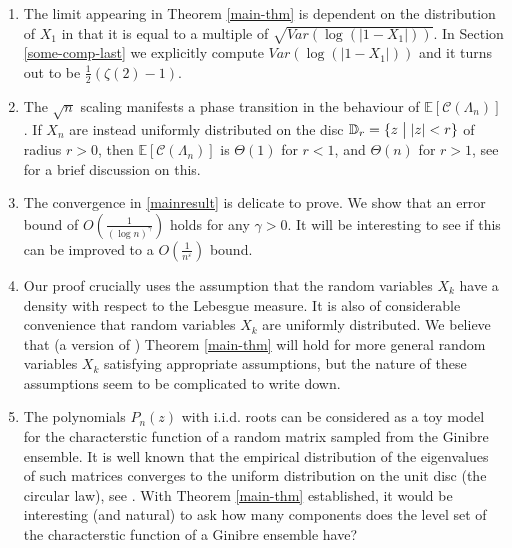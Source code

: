 \documentclass[9pt,a4paper,reqno]{amsart}
\theoremstyle{mine}
\theoremstyle{definition}
\theoremstyle{remark}
\renewcommand\epsilon{\varepsilon}
\newcommand{\mb}{\mathbb}
\begin{document}
\begin{enumerate}


    \item The limit appearing in Theorem \ref{main-thm} is dependent on the distribution of $X_1$ in that it is equal to a multiple of $\sqrt{Var(\log(|1-X_1|))}$. In Section \ref{some-comp-last} we explicitly compute $Var(\log(|1-X_1|))$ and it turns out to be $\frac{1}{2} \left(\zeta(2) - 1 \right)$.
 
    \item The $\sqrt{n}$ scaling manifests a phase transition in the behaviour of $\mb{E}[\mathscr{C}(\Lambda_n)]$. If $X_n$ are instead uniformly distributed on the disc $\mathbb{D}_r = \{z \hspace{1mm} \bigl| \hspace{1mm} |z| <r\}$ of radius $r>0$, then $\mb{E}[\mathscr{C}(\Lambda_n)]$ is $\Theta(1)$ for $r<1$, and $\Theta(n)$ for $r>1$, see \cite[Remark~$1.3$]{Ghosh-numberofcomponents} for a brief discussion on this.
    
    \item The convergence in \eqref{mainresult} is delicate to prove. We show that an error bound of $O(\frac{1}{(\log n)^\gamma})$ holds for any $\gamma>0$. It will be interesting to see if this can be improved to a $O(\frac{1}{n^\epsilon})$ bound. 

    \item Our proof crucially uses the assumption that the random variables $X_k$ have a density with respect to the Lebesgue measure. It is also 
    of considerable convenience that random variables $X_k$ are uniformly distributed. We believe that (a version of ) Theorem \ref{main-thm} will hold for more general random variables $X_k$ satisfying appropriate assumptions, but the nature of these assumptions seem to be complicated to write down.

    \item The polynomials $P_n(z)$ with i.i.d. roots can be considered as a toy model for the characterstic function of a random matrix sampled from the Ginibre ensemble. It is well known that the empirical distribution of the eigenvalues of such matrices converges to the uniform distribution on the unit disc (the circular law), see \cite{Tao-Vu-Randommatrices-universality-circularlaw}. With Theorem \ref{main-thm} established, it would be interesting (and natural) to ask how many components does the level set of the characterstic function of a Ginibre ensemble have? 
    

\end{enumerate}
\end{document}
